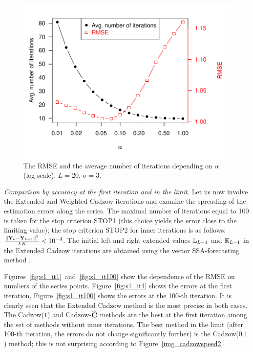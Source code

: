 \documentclass[sii]{ipart}
\begin{document}
\begin{figure}[!hhh]
	\includegraphics[width = \columnwidth]{2axis-3.pdf}
	\caption{The RMSE and the average number of iterations depending on $\alpha$ (log-scale), $L=20$, $\sigma=3$.}
	\label{img_2axis-3}
\end{figure}


\smallskip
\textit{Comparison by accuracy at the first iteration and in the limit.} Let us now involve the Extended and Weighted Cadzow iterations and examine the spreading of the estimation errors along the series. The maximal number of iterations equal to 100 is taken for the stop criterion STOP1 (this choice yields the error close to the limiting value); the stop criterion STOP2 for inner iterations is as follows:
$\frac{\|\mathbf{Y}_k - \mathbf{Y}_{k+1}\|^2}{LK} < 10^{-4}$. The initial left and right extended values $\mathbb{L}_{L-1}$ and $\mathbb{R}_{L-1}$ in the Extended Cadzow iterations are obtained using the vector SSA-forecasting method \cite[Section 2.3.1]{Golyandina.etal2001}.

Figures~\ref{fig:s1_it1}~and~\ref{fig:s1_it100} show the dependence of the RMSE on numbers of the series points. Figure~\ref{fig:s1_it1} shows the errors at the first iteration, Figure~\ref{fig:s1_it100} shows the errors at the 100-th iteration. It is clearly seen that the Extended Cadzow method is the most precise in both cases. The Cadzow($1$) and Cadzow-$\widehat{\mathbf{C}}$ methods are the best at the first iteration among the set of methods without inner iterations. The best method in the limit (after 100-th iteration, the errors do not change significantly further) is the Cadzow($0.1$) method; this is not surprising according to Figure~\ref{img_cadzowspeed2}.
\end{document}
